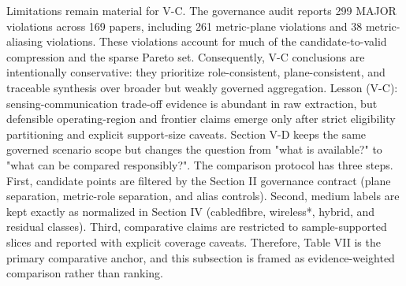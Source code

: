{}Limitations remain material for V-C. The governance audit reports 299 MAJOR violations across 169 papers, including 261 metric-plane violations and 38 metric-aliasing violations. These violations account for much of the candidate-to-valid compression and the sparse Pareto set. Consequently, V-C conclusions are intentionally conservative: they prioritize role-consistent, plane-consistent, and traceable synthesis over broader but weakly governed aggregation.\markdownRendererParagraphSeparator
{}Lesson (V-C): sensing-communication trade-off evidence is abundant in raw extraction, but defensible operating-region and frontier claims emerge only after strict eligibility partitioning and explicit support-size caveats.\markdownRendererInterblockSeparator
{}
\markdownRendererSectionEnd \markdownRendererSectionBegin
{}\markdownRendererInterblockSeparator
{}Section V-D keeps the same governed scenario scope but changes the question from "what is available?" to "what can be compared responsibly?". The comparison protocol has three steps. First, candidate points are filtered by the Section II governance contract (plane separation, metric-role separation, and alias controls). Second, medium labels are kept exactly as normalized in Section IV (cabled\markdownRendererUnderscore{}fibre, wireless\markdownRendererUnderscore{}*, hybrid, and residual classes). Third, comparative claims are restricted to sample-supported slices and reported with explicit coverage caveats. Therefore, Table VII is the primary comparative anchor, and this subsection is framed as evidence-weighted comparison rather than ranking.\markdownRendererParagraphSeparator
{}\markdownRendererInterblockSeparator
{}\markdownRendererInterblockSeparator
